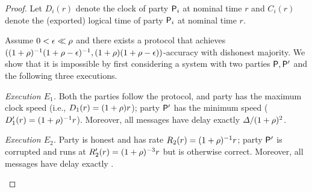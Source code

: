 \begin{proof}
    Let $D_i(r)$ denote the clock of party $\mathsf{P}_i$ at nominal time $r$ and $C_i(r)$ denote the (exported) logical time of party $\mathsf{P}_i$ at nominal time $r$.

    Assume $0 < \epsilon \ll \rho$ and there exists a protocol that achieves  $((1 + \rho)^{-1} (1 + \rho - \epsilon)^{-1}, (1 + \rho) (1 + \rho - \epsilon))$-accuracy with dishonest majority.
    We show that it is impossible by first considering a system with two parties $\mathsf{P}, \mathsf{P}'$ and the following three executions.
    \begin{cccItemize}[noitemsep]
        \item \emph{Execution $E_1$.}
        Both the parties follow the protocol, and party \party has the maximum clock speed (i.e., $D_1(r) = (1 + \rho) r$); party $\mathsf{P}'$ has the minimum speed ($D'_1(r) = (1 + \rho)^{-1} r$).
        Moreover, all messages have delay exactly $\varDelta / (1 + \rho)^2$.

        \item \emph{Execution $E_2$.}
        Party \party is honest and has rate $R_2(r) = (1 + \rho)^{-1} r$; party $\mathsf{P}'$ is corrupted and runs at $R'_2(r) = (1 + \rho)^{-3} r$ but is otherwise correct.
        Moreover, all messages have delay exactly \delay.


\end{cccItemize}
\end{proof}
